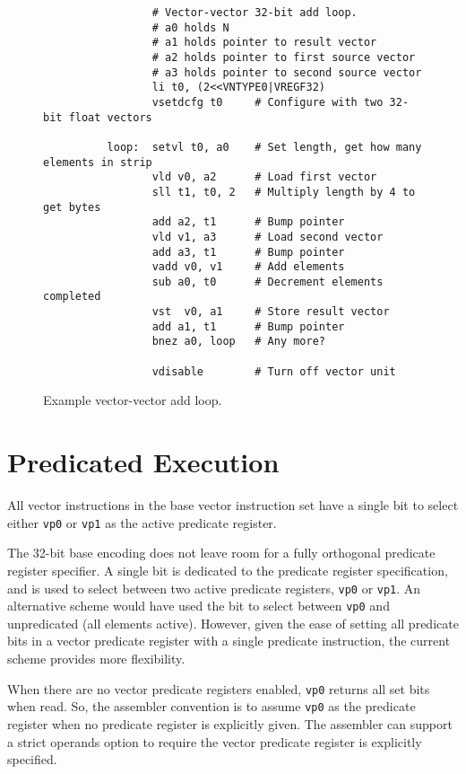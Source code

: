 \begin{figure}[bt]
  \centering
\begin{verbatim}
                 # Vector-vector 32-bit add loop.
                 # a0 holds N
                 # a1 holds pointer to result vector
                 # a2 holds pointer to first source vector
                 # a3 holds pointer to second source vector
                 li t0, (2<<VNTYPE0|VREGF32)
                 vsetdcfg t0     # Configure with two 32-bit float vectors

          loop:  setvl t0, a0    # Set length, get how many elements in strip
                 vld v0, a2      # Load first vector
                 sll t1, t0, 2   # Multiply length by 4 to get bytes
                 add a2, t1      # Bump pointer
                 vld v1, a3      # Load second vector
                 add a3, t1      # Bump pointer
                 vadd v0, v1     # Add elements
                 sub a0, t0      # Decrement elements completed
                 vst  v0, a1     # Store result vector
                 add a1, t1      # Bump pointer
                 bnez a0, loop   # Any more?

                 vdisable        # Turn off vector unit
\end{verbatim}
\caption{Example vector-vector add loop.}
\label{fig:vvadd}
\end{figure}

\section{Predicated Execution}

All vector instructions in the base vector instruction set have a
single bit to select either {\tt vp0} or {\tt vp1} as the active
predicate register.

\begin{commentary}
  The 32-bit base encoding does not leave room for a fully orthogonal
  predicate register specifier.  A single bit is dedicated to the
  predicate register specification, and is used to select between two
  active predicate registers, {\tt vp0} or {\tt vp1}. An alternative
  scheme would have used the bit to select between {\tt vp0} and
  unpredicated (all elements active).  However, given the ease of
  setting all predicate bits in a vector predicate register with a
  single predicate instruction, the current scheme provides more
  flexibility.

  When there are no vector predicate registers enabled, {\tt vp0}
  returns all set bits when read.  So, the assembler convention is to
  assume {\tt vp0} as the predicate register when no predicate
  register is explicitly given.  The assembler can support a strict
  operands option to require the vector predicate register is
  explicitly specified.
\end{commentary}

